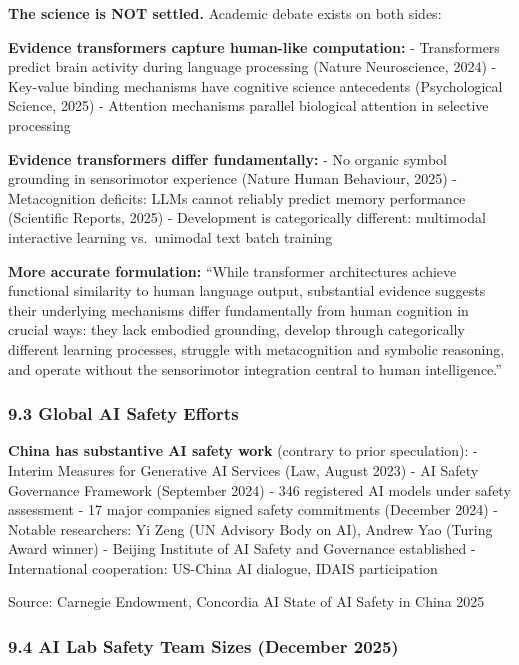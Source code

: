 \documentclass[
  11pt,
]{article}
\begin{document}
\textbf{The science is NOT settled.} Academic debate exists on both
sides:

\textbf{Evidence transformers capture human-like computation:} -
Transformers predict brain activity during language processing (Nature
Neuroscience, 2024) - Key-value binding mechanisms have cognitive
science antecedents (Psychological Science, 2025) - Attention mechanisms
parallel biological attention in selective processing

\textbf{Evidence transformers differ fundamentally:} - No organic symbol
grounding in sensorimotor experience (Nature Human Behaviour, 2025) -
Metacognition deficits: LLMs cannot reliably predict memory performance
(Scientific Reports, 2025) - Development is categorically different:
multimodal interactive learning vs.~unimodal text batch training

\textbf{More accurate formulation:} ``While transformer architectures
achieve functional similarity to human language output, substantial
evidence suggests their underlying mechanisms differ fundamentally from
human cognition in crucial ways: they lack embodied grounding, develop
through categorically different learning processes, struggle with
metacognition and symbolic reasoning, and operate without the
sensorimotor integration central to human intelligence.''

\subsubsection{9.3 Global AI Safety
Efforts}\label{global-ai-safety-efforts}

\textbf{China has substantive AI safety work} (contrary to prior
speculation): - Interim Measures for Generative AI Services (Law, August
2023) - AI Safety Governance Framework (September 2024) - 346 registered
AI models under safety assessment - 17 major companies signed safety
commitments (December 2024) - Notable researchers: Yi Zeng (UN Advisory
Body on AI), Andrew Yao (Turing Award winner) - Beijing Institute of AI
Safety and Governance established - International cooperation: US-China
AI dialogue, IDAIS participation

Source: Carnegie Endowment, Concordia AI State of AI Safety in China
2025

\subsubsection{9.4 AI Lab Safety Team Sizes (December
2025)}\label{ai-lab-safety-team-sizes-december-2025}
\end{document}
